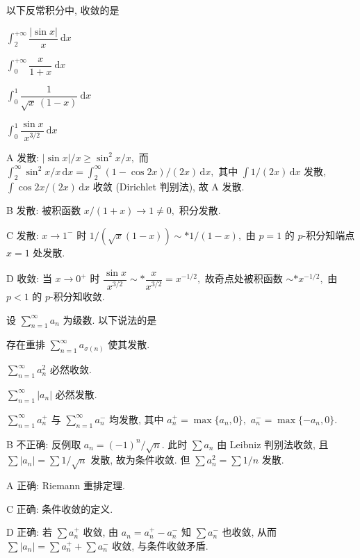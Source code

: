 \begin{question}
以下反常积分中, 收敛的是 \paren[D]

\begin{choices}
\item $\displaystyle\int_2^{+\infty} \dfrac{|\sin x|}{x} ~ \mathrm{d}x$
\item $\displaystyle\int_0^{+\infty} \dfrac{x}{1+x} ~ \mathrm{d}x$
\item $\displaystyle\int_0^1 \dfrac{1}{\sqrt{x}\,(1-x)} ~ \mathrm{d}x$
\item $\displaystyle\int_0^1 \dfrac{\sin x}{x^{3/2}} ~ \mathrm{d}x$
\end{choices}
\end{question}

\begin{solution}
A 发散: $|\sin x|/x \geqslant \sin^2 x / x,$ 而 $\int_2^\infty \sin^2 x / x\,\mathrm{d}x = \int_2^\infty (1-\cos 2x)/(2x)\,\mathrm{d}x,$ 其中 $\int 1/(2x)\,\mathrm{d}x$ 发散, $\int \cos 2x/(2x)\,\mathrm{d}x$ 收敛 (Dirichlet 判别法), 故 A 发散.

B 发散: 被积函数 $x/(1+x) \to 1 \neq 0,$ 积分发散.

C 发散: $x \to 1^-$ 时 $1/(\sqrt{x}(1-x)) \sim* 1/(1-x),$ 由 $p=1$ 的 $p$-积分知端点 $x=1$ 处发散.

D 收敛: 当 $x \to 0^+$ 时 $\dfrac{\sin x}{x^{3/2}} \sim* \dfrac{x}{x^{3/2}} = x^{-1/2},$ 故奇点处被积函数 $\sim* x^{-1/2},$ 由 $p < 1$ 的 $p$-积分知收敛.
\end{solution}

\begin{question}
设 $\displaystyle\sum_{n=1}^\infty a_n$ 为级数. 以下说法的是 \paren[B]

\begin{choices}
\item 存在重排 $\displaystyle\sum_{n=1}^\infty a_{\sigma(n)}$ 使其发散.
\item $\displaystyle\sum_{n=1}^\infty a_n^2$ 必然收敛.
\item $\displaystyle\sum_{n=1}^\infty |a_n|$ 必然发散.
\item $\displaystyle\sum_{n=1}^\infty a_n^+$ 与 $\displaystyle\sum_{n=1}^\infty a_n^-$ 均发散, 其中 $a_n^+ = \max\{a_n, 0\},$ $a_n^- = \max\{-a_n, 0\}.$
\end{choices}
\end{question}

\begin{solution}
B 不正确: 反例取 $a_n = (-1)^n / \sqrt{n}.$ 此时 $\sum a_n$ 由 Leibniz 判别法收敛, 且 $\sum |a_n| = \sum 1/\sqrt{n}$ 发散, 故为条件收敛. 但 $\sum a_n^2 = \sum 1/n$ 发散.

A 正确: Riemann 重排定理.

C 正确: 条件收敛的定义.

D 正确: 若 $\sum a_n^+$ 收敛, 由 $a_n = a_n^+ - a_n^-$ 知 $\sum a_n^-$ 也收敛, 从而 $\sum |a_n| = \sum a_n^+ + \sum a_n^-$ 收敛, 与条件收敛矛盾.
\end{solution}


